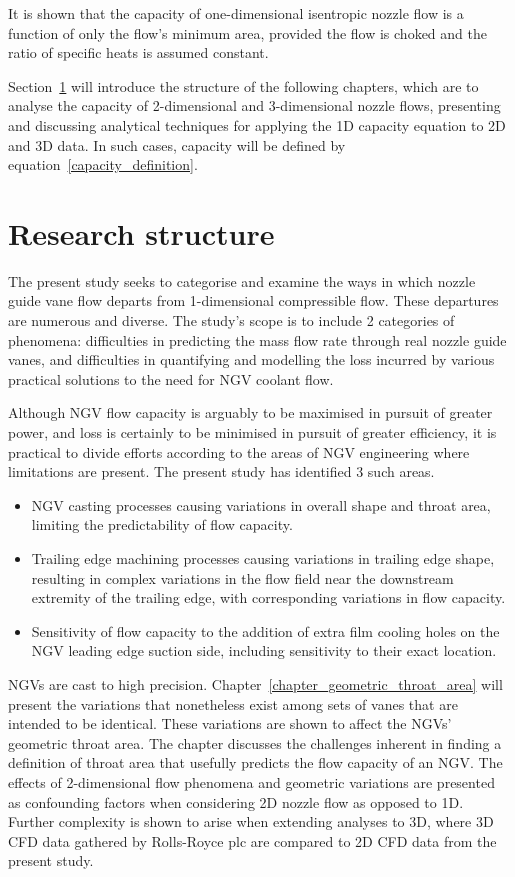 \documentclass[a4paper, 11pt, oneside]{report}
\begin{document}
It is shown that the capacity of one-dimensional isentropic nozzle flow is a function of only the flow's minimum area, provided the flow is choked and the ratio of specific heats is assumed constant. 

Section~\ref{research_structure} will introduce the structure of the following chapters, which are to analyse the capacity of 2-dimensional and 3-dimensional nozzle flows, presenting and discussing analytical techniques for applying the 1D capacity equation to 2D and 3D data. In such cases, capacity will be defined by equation~\ref{capacity_definition}.

\newpage
\section{Research structure}
\label{research_structure}

The present study seeks to categorise and examine the ways in which nozzle guide vane flow departs from 1-dimensional compressible flow. These departures are numerous and diverse. The study's scope is to include 2 categories of phenomena: difficulties in predicting the mass flow rate through real nozzle guide vanes, and difficulties in quantifying and modelling the loss incurred by various practical solutions to the need for NGV coolant flow.

Although NGV flow capacity is arguably to be maximised in pursuit of greater power, and loss is certainly to be minimised in pursuit of greater efficiency, it is practical to divide efforts according to the areas of NGV engineering where limitations are present. The present study has identified 3 such areas.
\begin{itemize}
	\item NGV casting processes causing variations in overall shape and throat area, limiting the predictability of flow capacity.
	\item Trailing edge machining processes causing variations in trailing edge shape, resulting in complex variations in the flow field near the downstream extremity of the trailing edge, with corresponding variations in flow capacity.
	\item Sensitivity of flow capacity to the addition of extra film cooling holes on the NGV leading edge suction side, including sensitivity to their exact location.
\end{itemize}

NGVs are cast to high precision. Chapter~\ref{chapter_geometric_throat_area} will present the variations that nonetheless exist among sets of vanes that are intended to be identical. These variations are shown to affect the NGVs' geometric throat area. The chapter discusses the challenges inherent in finding a definition of throat area that usefully predicts the flow capacity of an NGV. The effects of 2-dimensional flow phenomena and geometric variations are presented as confounding factors when considering 2D nozzle flow as opposed to 1D. Further complexity is shown to arise when extending analyses to 3D, where 3D CFD data gathered by Rolls-Royce plc are compared to 2D CFD data from the present study.
\end{document}
